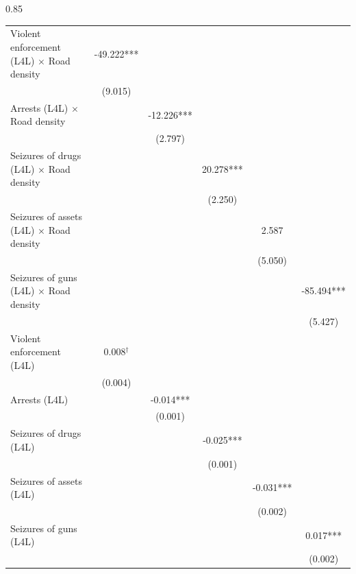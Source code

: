 \documentclass[12pt,letterpaper]{article}
\begin{document}
\begin{landscape}
\begin{center}
\begin{spacing}{0.85}
\begin{longtable}{lccccc}
Violent enforcement (L4L) $\times$ Road density & -49.222*** &   &   &   &    \\ 
 & (9.015)  &   &   &   &    \\ 
Arrests  (L4L)  $\times$ Road density &   & -12.226*** &   &   &    \\ 
 &   & (2.797)  &   &   &    \\ 
Seizures of drugs  (L4L)  $\times$ Road density &   &   & 20.278*** &   &    \\ 
 &   &   & (2.250)  &   &    \\ 
 Seizures of assets  (L4L)  $\times$ Road density &   &   &   & 2.587  &    \\ 
 &   &   &   & (5.050)  &    \\ 
 Seizures of guns  (L4L) $\times$ Road density &   &   &   &   & -85.494***  \\ 
 &   &   &   &   & (5.427)   \\ 
                 
Violent enforcement  (L4L)  & 0.008$^{\dag}$ &   &   &   &    \\ 
 & (0.004)  &   &   &   &    \\ 
Arrests  (L4L)  &   & -0.014*** &   &   &    \\ 
 &   & (0.001)  &   &   &    \\ 
Seizures of drugs  (L4L)  &   &   & -0.025*** &   &    \\ 
 &   &   & (0.001)  &   &    \\ 
Seizures of assets  (L4L)  &   &   &   & -0.031*** &    \\ 
 &   &   &   & (0.002)  &    \\ 
Seizures of guns  (L4L)  &   &   &   &   & 0.017***  \\ 
 &   &   &   &   & (0.002)   \\ 
                 
                 
                 

\end{longtable}
\end{spacing}
\end{center}
\end{landscape}
\end{document}

